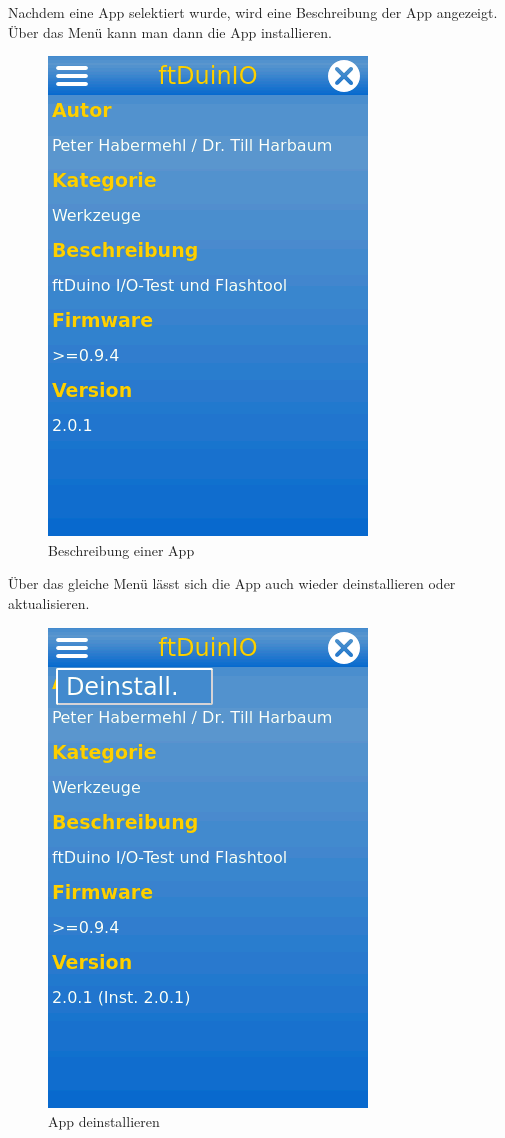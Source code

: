 \documentclass[
  paper=A4,
  ngerman,
  fontsize=12pt,
  parskip=half-,
]{scrbook}
\begin{document}
Nachdem eine App selektiert wurde, wird eine Beschreibung der
App angezeigt. Über das Menü kann man dann die App installieren.

\begin{figure}[ht]
\centering
\includegraphics[scale=0.4]{images/store-app-selected.png}
\caption{Beschreibung einer App}
\end{figure}

Über das gleiche Menü lässt sich die App auch wieder deinstallieren
oder aktualisieren.

\begin{figure}[ht]
\centering
\includegraphics[scale=0.4]{images/store-app-deinstall.png}
\caption{App deinstallieren}
\end{figure}
\end{document}
